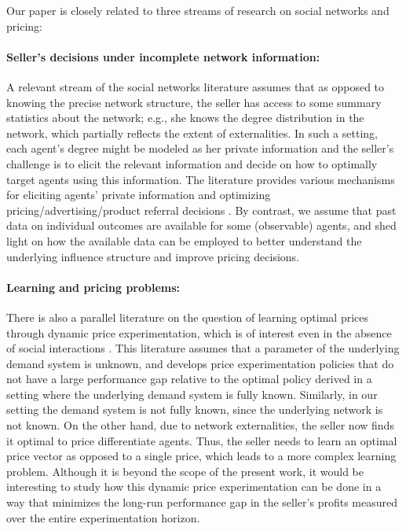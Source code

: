 \documentclass[opre,nonblindrev]{informs3} %
\begin{document}
Our paper is closely related to three streams of research on social networks and pricing:

\paragraph{Seller's decisions under incomplete network information:}
A relevant stream of the social networks literature assumes that
as opposed to knowing the precise network structure, the seller has access to some summary statistics about the network; e.g., she knows  the degree distribution in the network, which
partially reflects the extent of externalities.
In such a setting,
each agent's degree might be modeled as her private information and
the seller's challenge is to
elicit the relevant information and
decide on how to optimally target
agents
using this information.
The literature provides various mechanisms
for eliciting agents' private information and
optimizing
pricing/advertising/product referral decisions  \citep[e.g.,][]{hartline2008optimal,campbell2013word,galeotti2010,lobel2015customer,yingJu2016}.
By contrast,  we assume that past data on individual outcomes are available for some (observable) agents,
and shed light on how the available data can be employed to better understand the underlying influence structure and improve pricing decisions.




\paragraph{Learning and pricing problems:}
There is also a parallel literature on the question of learning optimal prices through dynamic price experimentation, which is of interest even in the absence of social interactions
\citep[e.g.,][]{harrison2012bayesian,keskin2014dynamic,besbes2015surprising}.
This literature assumes that a parameter of the underlying demand system is unknown,
and develops price experimentation policies
that do not have a large  performance gap relative to
the optimal policy derived in a setting where the  underlying demand system is fully known.
Similarly, in our setting
the  demand system is not fully known,
since the underlying network is not known.
On the other hand,  due to network externalities, the seller now finds it optimal to price differentiate agents. Thus,  the seller needs to learn an optimal price vector as opposed to a single price, which leads to a more complex learning problem. Although it is beyond the scope of the present work, it would be interesting to study how this dynamic price experimentation can be done in a way that minimizes the long-run performance gap in the seller's profits measured over the entire experimentation horizon. 
\end{document}
